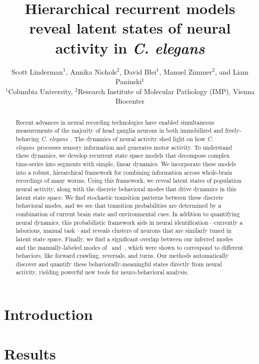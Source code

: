 \documentclass[11pt]{article}
\title{Hierarchical recurrent models reveal latent states of neural activity in \textit{C. elegans}}
\author{Scott Linderman$^{\text{1}}$,
  Annika Nichols$^{\text{2}}$,
  David Blei$^{\text{1}}$,
  Manuel Zimmer$^{\text{2}}$,
  and
  Liam Paninski$^{\text{1}}$
  \\
  $^{\text{1}}$Columbia University,
  $^{\text{2}}$Research Institute of Molecular Pathology (IMP), Vienna Biocenter
}
\newcommand{\celegans}{\textit{C. elegans}}
\begin{document}
\doublespacing

\maketitle

\begin{abstract}
  Recent advances in neural recording technologies have enabled
  simultaneous measurements of the majority of head ganglia neurons in
  both immobilized and freely-behaving
  \celegans~\citep{schrodel2013brain, prevedel2014simultaneous,
    nguyen2016whole}.  The dynamics of neural activity shed light on
  how \celegans~processes sensory information and generates motor
  activity.  To understand these dynamics, we develop recurrent state
  space models that decompose complex time-series into segments with
  simple, linear dynamics. We incorporate these models into a robust,
  hierarchical framework for combining information across whole-brain
  recordings of many worms.  Using this framework, we reveal latent
  states of population neural activity, along with the discrete
  behavioral modes that drive dynamics in this latent state space.  We
  find stochastic transition patterns between these discrete
  behavioral modes, and we see that transition probabilities are
  determined by a combination of current brain state and environmental
  cues.  In addition to quantifying neural dynamics, this
  probabilistic framework aids in neural identification---currently a
  laborious, manual task---and reveals clusters of neurons that are
  similarly tuned in latent state space.  Finally, we find a
  significant overlap between our inferred modes and the
  manually-labeled modes of~\citet{kato2015global}
  and~\citet{nichols2017global}, which were shown to correspond to
  different behaviors, like forward crawling, reversals, and
  turns. Our methods automatically discover and quantify these
  behaviorally-meaningful states directly from neural activity,
  yielding powerful new tools for neuro-behavioral analysis.
\end{abstract}

\clearpage

\section*{Introduction}

\clearpage

\section*{Results}
\end{document}
